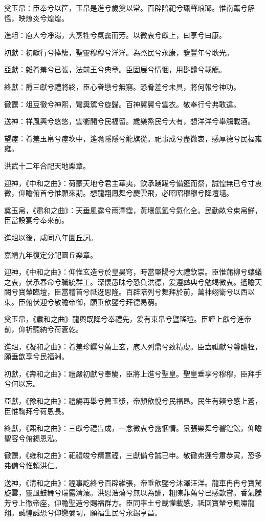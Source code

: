 奠玉帛：臣奉兮以筐，玉帛是進兮歲奠以常。百辟陪祀兮珮聲琅瑯。惟南薰兮解慍，映燎炎兮煌煌。

進俎：庖人兮凈湯，大烹牲兮氣靄而芳。以微衷兮獻上，曰享兮曰康。

初獻：初獻行兮捧觴，聖靈穆穆兮洋洋。為烝民兮永康，鑒豐年兮耿光。

亞獻：雜肴羞兮已張，法前王兮典章。臣固展兮情悃，用斟醴兮載觴。

終獻：爵三獻兮禮將終，臣心眷戀兮無窮。恐肴羞兮未具，將何報兮神功。

徹饌：俎豆徹兮神熙，鸞輿駕兮旋歸。百神翼翼兮雲衣。敬奉行兮弗敢違。

送神：祥風興兮悠悠，雲衢開兮民福留。歲樂烝民兮大有，想洋洋兮舉觴載酒。

望瘞：肴羞玉帛兮瘞坎中，遙瞻隱隱兮龍旗從。祀事成兮盡微衷，感厚德兮民福雍雍。

洪武十二年合祀天地樂章。

迎神，《中和之曲》：荷蒙天地兮君主華夷，欽承踴躍兮備筵而祭，誠惶無已兮寸衷微，仰瞻俯首兮惟願來期。想龍翔鳳舞兮慶雲飛，必昭昭穆穆兮降壇壝。

奠玉帛，《肅和之曲》：天垂風露兮雨澤霑，黃壤氤氳兮氣化全。民勤畝兮束帛鮮，臣當設宴兮奉來前。

進俎以後，咸同八年圜丘詞。

嘉靖九年復定分祀圜丘樂章。

迎神，《中和之曲》：仰惟玄造兮於皇昊穹，時當肇陽兮大禮欽崇。臣惟蒲柳兮螻蟻之衷，伏承春命兮職統群工。深懷愚昧兮恐負洪德，爰遵彞典兮勉竭微衷。遙瞻天闕兮寶輦臨壇，臣當稽首兮祗迓恩隆。百辟陪列兮舞拜於前，萬神翊衛兮以西以東。臣俯伏迎兮敬瞻帝御，願垂歆鑒兮拜德曷窮。

奠玉帛，《肅和之曲》龍輿既降兮奉禮先，爰有束帛兮暨瑤瑄。臣謹上獻兮進帝前，仰祈聽納兮荷蒼乾。

進俎，《凝和之曲》：肴羞珍饌兮薦上玄，庖人列鼎兮致精虔。臣盍祗獻兮馨醴牷，願垂歆享兮民福淵。

初獻，《壽和之曲》：禮嚴初獻兮奉觴，臣將上進兮聖皇。聖皇垂享兮穆穆，臣拜手兮何以忘。

亞獻，《豫和之曲》：禮觴再舉兮薦玉漿，帝顏歆悅兮民福昂。民生有賴兮感上蒼，臣惟鞠拜兮荷恩長。

終獻，《熙和之曲》：三獻兮禮告成，一念微衷兮露悃情。景張樂舞兮響鍠鋐，仰瞻聖容兮俯錫恩泓。

徹饌，《雍和之曲》：祀禮竣兮精意禋，三獻備兮誠已申。敬徹弗遲兮肅恭寅，恐多弗備兮惟賴洪仁。

送神，《清和之曲》：禋事訖終兮百辟維張，帝垂歆鑒兮沐澤汪洋。龍車冉冉兮寶駕旋雲，靈風鼓舞兮瑞露清瀼。洪恩浩蕩兮無以為酬，粗陳菲薦兮已感歆嘗。香氣騰芳兮上徹帝座，仰瞻聖造兮賜福群方。臣同率土兮載懽載感，祗回寶輦兮鳳嘯龍翔。誠惶誠恐兮仰戀彌切，願福生民兮永錫亨昌。

